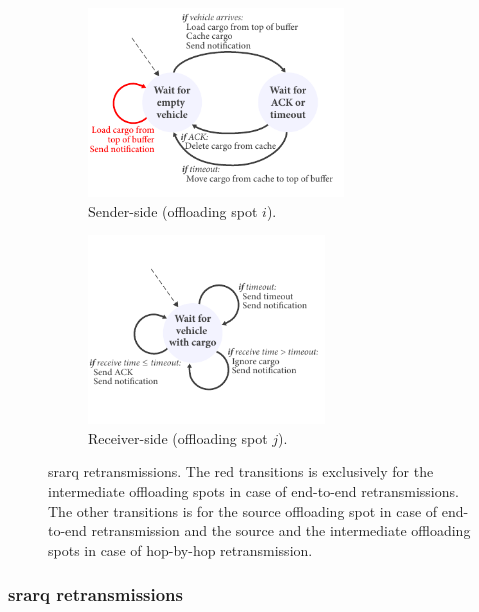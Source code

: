 \begin{figure}[!t]
    \centering
    \begin{subfigure}[b]{0.45\textwidth}
        \centering
        \includegraphics[height=5cm]{figures/retransmissions-sender.pdf}
        \caption{Sender-side (offloading spot $i$).}
        \label{fig:retransmissions-sender}
    \end{subfigure}%
    \qquad
    \begin{subfigure}[b]{0.45\textwidth}
        \centering
        \includegraphics[height=5cm]{figures/retransmissions-receiver.pdf}
        \caption{Receiver-side (offloading spot $j$).}
        \label{fig:retransmissions-receiver}
    \end{subfigure}%
    \caption{\acrshort{srarq} retransmissions. The red transitions is exclusively for the intermediate offloading spots in case of end-to-end retransmissions. The other transitions is for the source offloading spot in case of end-to-end retransmission and the source and the intermediate offloading spots in case of hop-by-hop retransmission.}
    \label{fig:retransmissions}
\end{figure}

\subsubsection{\acrshort{srarq} retransmissions}

